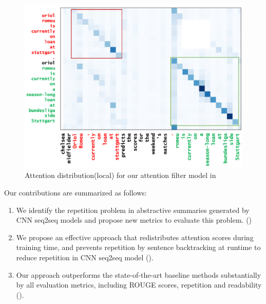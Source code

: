 {\begin{figure}[th!]
\centering
\includegraphics[width=0.9\linewidth]{map3}
\caption{Attention distribution(local) for our attention filter model in }
\label{fig:attn_map3}
\end{figure}
}%

Our contributions are summarized as follows:
\begin{enumerate}
\item We identify the repetition problem in abstractive summaries generated
by CNN seq2seq models and propose new metrics to evaluate this problem. ()
\item We propose an effective approach that redistributes attention scores 
during training time, and prevents repetition by sentence backtracking
at runtime to reduce repetition in CNN seq2seq model ().
\item Our approach outperforms the state-of-the-art baseline methods 
substantially by all evaluation metrics, including ROUGE scores, 
repetition and readability ().
\end{enumerate}

